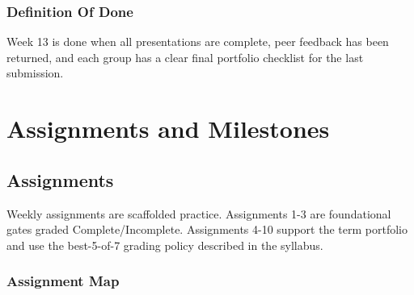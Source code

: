 \documentclass[
  letterpaper,
  DIV=11,
  numbers=noendperiod,
  oneside]{scrreprt}
\begin{document}
\section*{Definition Of Done}\label{definition-of-done-9}


Week 13 is done when all presentations are complete, peer feedback has
been returned, and each group has a clear final portfolio checklist for
the last submission.

\part{Assignments and Milestones}

\chapter*{Assignments}\label{assignments}


Weekly assignments are scaffolded practice. Assignments 1-3 are
foundational gates graded Complete/Incomplete. Assignments 4-10 support
the term portfolio and use the best-5-of-7 grading policy described in
the syllabus.

\section*{Assignment Map}\label{assignment-map}

\end{document}
